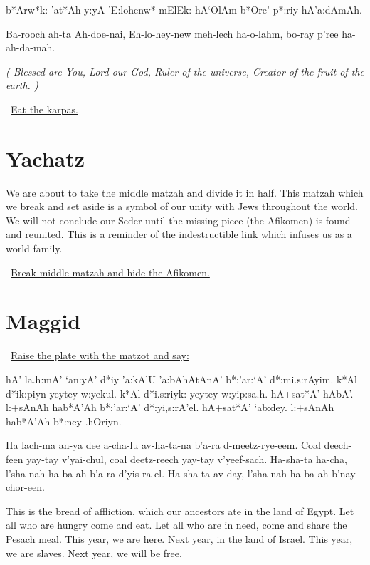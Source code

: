 \documentclass[12pt]{article}
\newenvironment{hebrewPrayer}
    {\begin{cjhebrew}
     \Large
    }
    { 
    \end{cjhebrew}
    }
\newenvironment{hebrewTransliteration}{}{\par}
\newenvironment{unreadHebrewTranslation}{\itshape(\hspace{-0.2em}}{\hspace{-0.2em})\par}
\newenvironment{hebrewTranslation}{}{\par}
\newcommand{\god}{God}
\newcommand{\hebrewVowelDotDotL}{e} %
\newcommand{\transliterateAdonai}{Ah-doe-nai}
\newcommand{\transliterateEloheinu}{Eh-lo-hey-new}
\newcommand{\baruchAdonai}{b*Arw*k: 'at*Ah y:yA}
\newcommand{\transliterateBaruchAdonai}{Ba-rooch ah-ta {\transliterateAdonai}}
\newcommand{\translateBaruchAdonai}{Blessed are You, Lord our \god}
\newcommand{\baruchHaolam}{{\baruchAdonai} 'E:loh{\hebrewVowelDotDotL}nw* mElEk: hA`OlAm}
\newcommand{\transliterateBaruchHaolam}{{\transliterateBaruchAdonai}, {\transliterateEloheinu} meh-lech ha-o-lahm}
\newcommand{\translateBaruchHaolam}{{\translateBaruchAdonai}, Ruler of the universe}
\newcommand{\inlineSederAction}[1]{\faHandORight{}~\underline{#1}}
\newcommand{\sederAction}[1]{\inlineSederAction{#1}\par}
\newcommand{\sederSection}[2]{
    \section*{#1 \Huge\cjRL{#2}}
}
\begin{document}
\begin{minipage}[t]{\textwidth}
    \begin{hebrewPrayer}
        {\baruchHaolam} b*Ore' p*:riy hA'a:dAmAh\textrm{.}
    \end{hebrewPrayer}
    
    \begin{hebrewTransliteration}
        {\transliterateBaruchHaolam}, bo-ray p'ree ha-ah-da-mah. 
    \end{hebrewTransliteration}
    
    \begin{unreadHebrewTranslation}
        {\translateBaruchHaolam}, Creator of the fruit of the earth.
    \end{unreadHebrewTranslation}
    \sederAction{Eat the karpas.}
\end{minipage}

\sederSection{Yachatz}{ya.ha.s}
We are about to take the middle matzah and divide it in half. This matzah which we break and set aside is a symbol of our unity with Jews throughout the world. We will not conclude our Seder until the missing piece (the Afikomen) is found and reunited. This is a reminder of the indestructible link which infuses us as a world family.

\sederAction{Break middle matzah and hide the Afikomen.}

\begin{minipage}[t]{\textwidth}
    \sederSection{Maggid}{mag*iyd}
    \sederAction{Raise the plate with the matzot and say:}
    \begin{hebrewPrayer}
        hA' la.h:mA' `an:yA' d*iy 'a:kAlU 'a:bAhAtAnA' b*:'ar:`A' d*:mi.s:rAyim\textrm{.} k*Al d*ik:piyn yeytey w:yekul\textrm{.} k*Al d*i.s:riyk: yeytey w:yip:sa.h\textrm{.} hA+sat*A' hAbA'\textrm{.} l:+sAnAh hab*A'Ah b*:'ar:`A' d*:yi,s:rA'el\textrm{.} hA+sat*A' `ab:dey\textrm{.} l:+sAnAh hab*A'Ah b*:ney .hOriyn\textrm{.}
    \end{hebrewPrayer}
    
    \begin{hebrewTransliteration}
        Ha lach-ma an-ya dee a-cha-lu av-ha-ta-na b'a-ra d-meetz-rye-eem. Coal deech-feen yay-tay v'yai-chul, coal deetz-reech yay-tay v'yeef-sach. Ha-sha-ta ha-cha, l'sha-nah ha-ba-ah b'a-ra d'yis-ra-el. Ha-sha-ta av-day, l'sha-nah ha-ba-ah b'nay chor-een.
    \end{hebrewTransliteration}
    
    \begin{hebrewTranslation}
        This is the bread of affliction, which our ancestors ate in the land of Egypt. Let all who are hungry come and eat. Let all who are in need, come and share the Pesach meal. This year, we are here. Next year, in the land of Israel. This year, we are slaves. Next year, we will be free.
    \end{hebrewTranslation}
\end{minipage}
\end{document}
